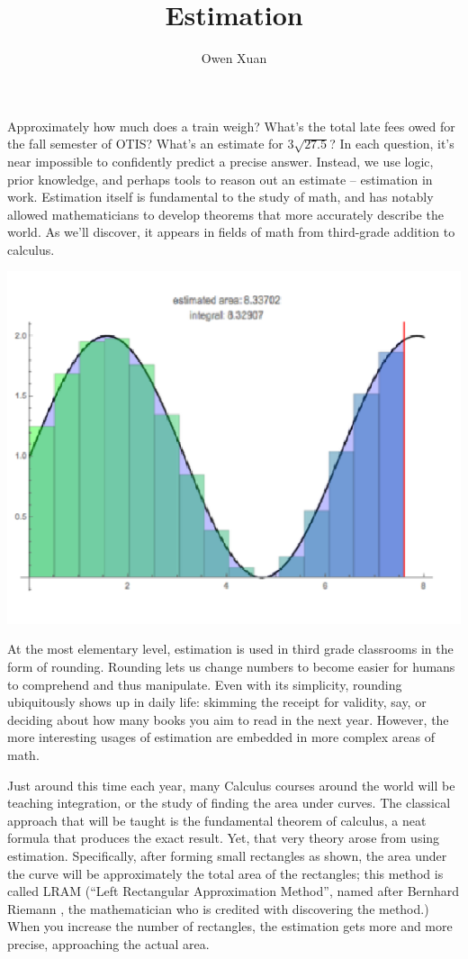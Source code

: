 \documentclass{article}
\title{Estimation}
\author{Owen Xuan}
\begin{document}
\maketitle
Approximately how much does a train weigh? What’s the total late fees owed for the fall semester of OTIS? What’s an estimate for $3\sqrt{27.5}$? In each question, it’s near impossible to confidently predict a precise answer. Instead, we use logic, prior knowledge, and perhaps tools to reason out an estimate – estimation in work. Estimation itself is fundamental to the study of math, and has notably allowed mathematicians to develop theorems that more accurately describe the world. As we’ll discover, it appears in fields of math from third-grade addition to calculus.

\begin{center}
\includegraphics[scale=0.75]{images/estimate.png}
\end{center}

At the most elementary level, estimation is used in third grade classrooms in the form of rounding. Rounding lets us change numbers to become easier for humans to comprehend and thus manipulate. Even with its simplicity, rounding ubiquitously shows up in daily life: skimming the receipt for validity, say, or deciding about how many books you aim to read in the next year. However, the more interesting usages of estimation are embedded in more complex areas of math. 

Just around this time each year, many Calculus courses around the world will be teaching integration, or the study of finding the area under curves. The classical approach that will be taught is the fundamental theorem of calculus, a neat formula that produces the exact result. Yet, that very theory arose from using estimation. Specifically, after forming small rectangles as shown, the area under the curve will be approximately the total area of the rectangles; this method is called LRAM (“Left Rectangular Approximation Method”, named after Bernhard Riemann , the mathematician who is credited with discovering the method.) When you increase the number of rectangles, the estimation gets more and more precise, approaching the actual area.  
\end{document}
